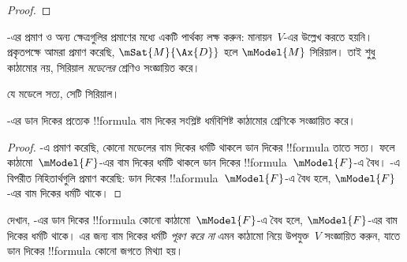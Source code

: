 \documentclass[../../../include/open-logic-section]{subfiles}
\begin{document}
\begin{proof}
\end{proof}

-এর প্রমাণ ও অন্য ক্ষেত্রগুলির প্রমাণের মধ্যে একটি পার্থক্য লক্ষ করুন: মানায়ন~$V$-এর উল্লেখ করতে হয়নি। প্রকৃতপক্ষে আমরা প্রমাণ করেছি, $$ হলে $$ সিরিয়াল। তাই  শুধু কাঠামোর নয়, সিরিয়াল \emph{মডেলের} শ্রেণিও সংজ্ঞায়িত করে।

\begin{cor}
  যে মডেলে  সত্য, সেটি সিরিয়াল।
\end{cor}

\begin{cor}
-এর ডান দিকের প্রত্যেক !!{formula} বাম দিকের সংশ্লিষ্ট ধর্মবিশিষ্ট কাঠামোর শ্রেণিকে সংজ্ঞায়িত করে।
\end{cor}

\begin{proof}
  -এ প্রমাণ করেছি, কোনো মডেলের বাম দিকের ধর্মটি থাকলে ডান দিকের !!{formula} তাতে সত্য। ফলে কাঠামো~$$-এর বাম দিকের ধর্মটি থাকলে ডান দিকের !!{formula}~$$-এ বৈধ। -এ বিপরীত নিহিতার্থগুলি প্রমাণ করেছি: ডান দিকের !!a{formula}~$$-এ বৈধ হলে, $$-এর বাম দিকের ধর্মটি থাকে।
\end{proof}

\begin{prob}
দেখান, -এর ডান দিকের !!{formula} কোনো কাঠামো~$$-এ বৈধ হলে, $$-এর বাম দিকের ধর্মটি থাকে। এর জন্য বাম দিকের ধর্মটি \emph{পূরণ করে না} এমন কাঠামো নিয়ে উপযুক্ত~$V$ সংজ্ঞায়িত করুন, যাতে ডান দিকের !!{formula} কোনো জগতে মিথ্যা হয়।
\end{prob}
\end{document}

